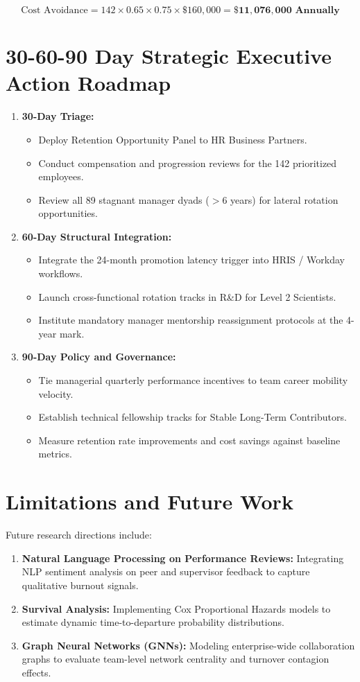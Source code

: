 \documentclass[12pt,a4paper,oneside]{report}
\begin{document}
\begin{equation}
\text{Cost Avoidance} = 142 \times 0.65 \times 0.75 \times \$160,000 = \mathbf{\$11,076,000 \text{ Annually}}
\end{equation}

\section{30-60-90 Day Strategic Executive Action Roadmap}
\begin{enumerate}
  \item \textbf{30-Day Triage:}
    \begin{itemize}
      \item Deploy Retention Opportunity Panel to HR Business Partners.
      \item Conduct compensation and progression reviews for the 142 prioritized employees.
      \item Review all 89 stagnant manager dyads ($>6$ years) for lateral rotation opportunities.
    \end{itemize}
  \item \textbf{60-Day Structural Integration:}
    \begin{itemize}
      \item Integrate the 24-month promotion latency trigger into HRIS / Workday workflows.
      \item Launch cross-functional rotation tracks in R\&D for Level 2 Scientists.
      \item Institute mandatory manager mentorship reassignment protocols at the 4-year mark.
    \end{itemize}
  \item \textbf{90-Day Policy and Governance:}
    \begin{itemize}
      \item Tie managerial quarterly performance incentives to team career mobility velocity.
      \item Establish technical fellowship tracks for Stable Long-Term Contributors.
      \item Measure retention rate improvements and cost savings against baseline metrics.
    \end{itemize}
\end{enumerate}

\section{Limitations and Future Work}
Future research directions include:
\begin{enumerate}
  \item \textbf{Natural Language Processing on Performance Reviews:} Integrating NLP sentiment analysis on peer and supervisor feedback to capture qualitative burnout signals.
  \item \textbf{Survival Analysis:} Implementing Cox Proportional Hazards models to estimate dynamic time-to-departure probability distributions.
  \item \textbf{Graph Neural Networks (GNNs):} Modeling enterprise-wide collaboration graphs to evaluate team-level network centrality and turnover contagion effects.
\end{enumerate}
\end{document}
